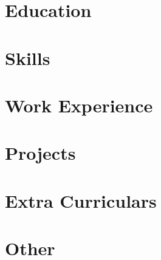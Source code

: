 \documentclass[a4paper,12pt]{article}
\begin{document}
\pagestyle{empty} 


\vspace{12pt}

\section{Education}

\vspace{12pt}

\section{Skills}

\vspace{12pt}

\section{Work Experience}



\vspace{12pt}

\section{Projects}




\vspace{12pt}

\section{Extra Curriculars}

\vspace{12pt}

\section{Other}

\vspace{12pt}
\end{document}

